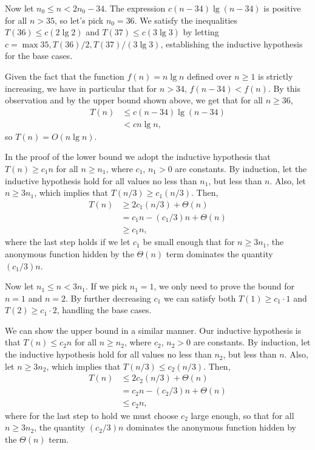 Now let $n_0\le n<2n_0-34$.
The expression $c(n-34)\lg(n-34)$ is positive for all $n>35$, so let's pick $n_0=36$.
We satisfy the inequalities $T(36)\le c(2\lg2)$ and $T(37)\le c(3\lg3)$ by letting $c=\max{35,T(36)/2,T(37)/(3\lg3)}$, establishing the inductive hypothesis for the base cases.

Given the fact that the function $f(n)=n\lg n$ defined over $n\ge1$ is strictly increasing, we have in particular that for $n>34$, $f(n-34)<f(n)$.
By this observation and by the upper bound shown above, we get that for all $n\ge36$,
\begin{align*}
    T(n) &\le c(n-34)\lg(n-34) \\
    &< cn\lg n,
\end{align*}
so $T(n)=O(n\lg n)$.

\subexercise
In the proof of the lower bound we adopt the inductive hypothesis that $T(n)\ge c_1n$ for all $n\ge n_1$, where $c_1$, $n_1>0$ are constants.
By induction, let the inductive hypothesis hold for all values no less than $n_1$, but less than $n$.
Also, let $n\ge3n_1$, which implies that $T(n/3)\ge c_1(n/3)$.
Then,
\begin{align*}
    T(n) &\ge 2c_1(n/3)+\Theta(n) \\
    &= c_1n-(c_1/3)n+\Theta(n) \\
    &\ge c_1n,
\end{align*}
where the last step holds if we let $c_1$ be small enough that for $n\ge3n_1$, the anonymous function hidden by the $\Theta(n)$ term dominates the quantity $(c_1/3)n$.

Now let $n_1\le n<3n_1$.
If we pick $n_1=1$, we only need to prove the bound for $n=1$ and $n=2$.
By further decreasing $c_1$ we can satisfy both $T(1)\ge c_1\cdot1$ and $T(2)\ge c_1\cdot2$, handling the base cases.

We can show the upper bound in a similar manner.
Our inductive hypothesis is that $T(n)\le c_2n$ for all $n\ge n_2$, where $c_2$, $n_2>0$ are constants.
By induction, let the inductive hypothesis hold for all values no less than $n_2$, but less than $n$.
Also, let $n\ge3n_2$, which implies that $T(n/3)\le c_2(n/3)$.
Then,
\begin{align*}
    T(n) &\le 2c_2(n/3)+\Theta(n) \\
    &= c_2n-(c_2/3)n+\Theta(n) \\
    &\le c_2n,
\end{align*}
where for the last step to hold we must choose $c_2$ large enough, so that for all $n\ge3n_2$, the quantity $(c_2/3)n$ dominates the anonymous function hidden by the $\Theta(n)$ term.

